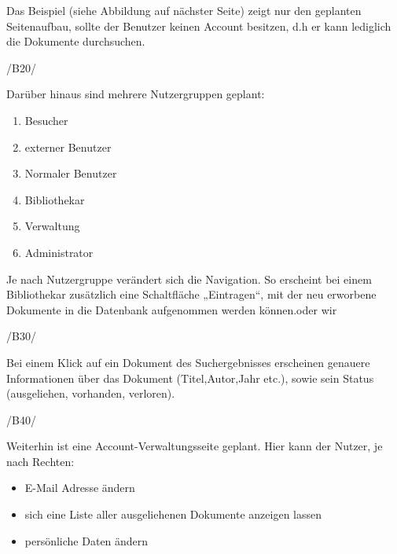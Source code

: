 Das Beispiel (siehe Abbildung auf nächster Seite) zeigt nur den geplanten Seitenaufbau, sollte der Benutzer keinen
Account besitzen, d.h er kann lediglich die Dokumente durchsuchen.

/B20/

Darüber hinaus sind mehrere Nutzergruppen geplant:

\begin{enumerate}
\item Besucher
\item externer Benutzer
\item Normaler Benutzer
\item Bibliothekar
\item Verwaltung
\item Administrator
\end{enumerate}

Je nach Nutzergruppe verändert sich die Navigation. So erscheint bei einem Bibliothekar zusätzlich eine 
Schaltfläche „Eintragen“, mit der neu erworbene Dokumente in die Datenbank aufgenommen werden können.oder wir


/B30/

Bei einem Klick auf ein Dokument des Suchergebnisses erscheinen genauere Informationen über das Dokument (Titel,Autor,Jahr etc.), sowie
sein Status (ausgeliehen, vorhanden, verloren).

/B40/

Weiterhin ist eine Account-Verwaltungsseite geplant.
\newline
\newline
Hier kann der Nutzer, je nach Rechten:

\begin{itemize}
\item E-Mail Adresse ändern
\item sich eine Liste aller ausgeliehenen Dokumente anzeigen lassen
\item persönliche Daten ändern
\end{itemize}





 
